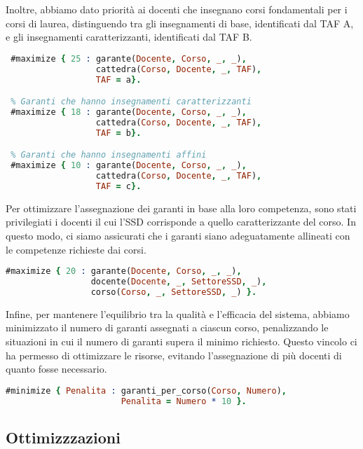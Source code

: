 Inoltre, abbiamo dato priorità ai docenti che insegnano corsi fondamentali per i 
corsi di laurea, distinguendo tra gli insegnamenti di base, identificati dal TAF A, 
e gli insegnamenti caratterizzanti, identificati dal TAF B.

\begin{lstlisting}[language=prolog, caption=Gestione delle priorità del TAF.]
 % Garanti che hanno insegnamenti di base
 #maximize { 25 : garante(Docente, Corso, _, _), 
                  cattedra(Corso, Docente, _, TAF), 
                  TAF = a}.

 % Garanti che hanno insegnamenti caratterizzanti
 #maximize { 18 : garante(Docente, Corso, _, _), 
                  cattedra(Corso, Docente, _, TAF), 
                  TAF = b}.

 % Garanti che hanno insegnamenti affini
 #maximize { 10 : garante(Docente, Corso, _, _), 
                  cattedra(Corso, Docente, _, TAF), 
                  TAF = c}.
\end{lstlisting}

Per ottimizzare l'assegnazione dei garanti in base alla loro competenza, sono stati 
privilegiati i docenti il cui l'SSD corrisponde a quello caratterizzante del corso.
In questo modo, ci siamo assicurati che i garanti siano adeguatamente allineati con 
le competenze richieste dai corsi.

\begin{lstlisting}[language=prolog, caption=Preferenza dei garanti con macrosettore coerente a quello del corso.]
% Ottimizzare i garanti con SSD caratterizzante
#maximize { 20 : garante(Docente, Corso, _, _), 
                 docente(Docente, _, SettoreSSD, _), 
                 corso(Corso, _, SettoreSSD, _) }.
\end{lstlisting}

Infine, per mantenere l'equilibrio tra la qualità e l'efficacia del sistema, abbiamo 
minimizzato il numero di garanti assegnati a ciascun corso, penalizzando le situazioni 
in cui il numero di garanti supera il minimo richiesto. Questo vincolo ci ha permesso 
di ottimizzare le risorse, evitando l'assegnazione di più docenti di quanto fosse necessario.

\begin{lstlisting}[language=prolog, caption=Minimizzazione dei garanti per corso di laurea.]
% Minimizzo il numero di garanti per ogni corso
#minimize { Penalita : garanti_per_corso(Corso, Numero),
                       Penalita = Numero * 10 }.
\end{lstlisting}

\subsection{Ottimizzzazioni}\label{sec:optimizations}